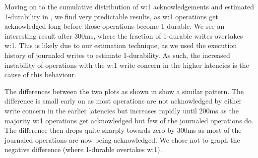 Moving on to the cumulative distribution of w:1 acknowledgements and estimated 1-durability in , we find very predictable results, as w:1 operations get acknowledged long before those operations become 1-durable. We see an interesting result after 300ms, where the fraction of 1-durable writes overtakes w:1. This is likely due to our estimation technique, as we used the execution history of journaled writes to estimate 1-durability. As such, the increased instability of operations with the w:1 write concern in the higher latencies is the cause of this behaviour.

The differences between the two plots as shown in  show a similar pattern. The difference is small early on as most operations are not acknowledged by either write concern in the earlier latencies but increases rapidly until 200ms as the majority w:1 operations get acknowledged but few of the journaled operations do. The difference then drops quite sharply towards zero by 300ms as most of the journaled operations are now being acknowledged. We chose not to graph the negative difference (where 1-durable overtakes w:1).